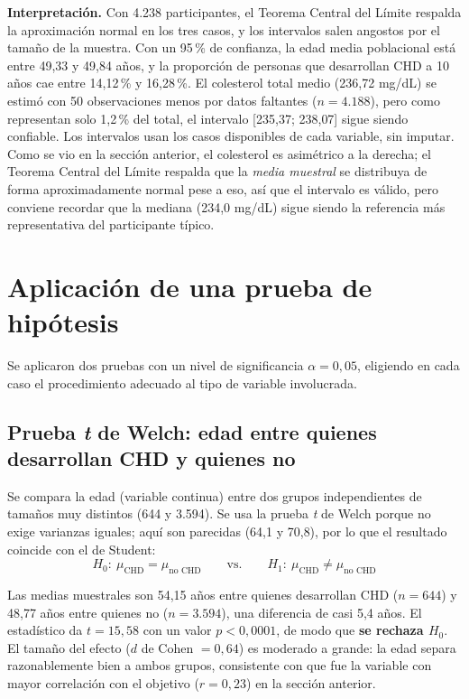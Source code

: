\documentclass[11pt,a4paper]{article}
\begin{document}
\textbf{Interpretación.} Con 4.238 participantes, el Teorema Central del Límite respalda la
aproximación normal en los tres casos, y los intervalos salen angostos por el tamaño de la
muestra. Con un 95\,\% de confianza, la edad media poblacional está entre 49{,}33 y 49{,}84 años, y la
proporción de personas que desarrollan CHD a 10 años cae entre 14{,}12\,\% y 16{,}28\,\%. El colesterol
total medio (236{,}72 mg/dL) se estimó con 50 observaciones menos por datos faltantes ($n=4.188$),
pero como representan solo 1{,}2\,\% del total, el intervalo [235{,}37; 238{,}07] sigue siendo confiable. Los intervalos usan los casos disponibles de cada variable, sin imputar. Como se vio en la sección anterior, el colesterol es asimétrico a la derecha; el Teorema Central
del Límite respalda que la \textit{media muestral} se distribuya de forma aproximadamente normal
pese a eso, así que el intervalo es válido, pero conviene recordar que la mediana (234{,}0 mg/dL)
sigue siendo la referencia más representativa del participante típico.

\section{Aplicación de una prueba de hipótesis}

Se aplicaron dos pruebas con un nivel de significancia $\alpha = 0{,}05$, eligiendo en cada caso el
procedimiento adecuado al tipo de variable involucrada.

\subsection{Prueba \textit{t} de Welch: edad entre quienes desarrollan CHD y quienes no}
Se compara la edad (variable continua) entre dos grupos independientes de tamaños muy distintos (644 y 3.594). Se usa la prueba \textit{t} de Welch porque no exige varianzas iguales; aquí son parecidas (64{,}1 y 70{,}8), por lo que el resultado coincide con el de Student:
$$H_0:\ \mu_{\text{CHD}} = \mu_{\text{no CHD}} \qquad \text{vs.} \qquad H_1:\ \mu_{\text{CHD}} \neq \mu_{\text{no CHD}}$$

Las medias muestrales son 54{,}15 años entre quienes desarrollan CHD ($n=644$) y 48{,}77 años entre
quienes no ($n=3.594$), una diferencia de casi 5{,}4 años. El estadístico da $t=15{,}58$ con un valor
$p<0{,}0001$, de modo que \textbf{se rechaza $H_0$}. El tamaño del efecto ($d$ de Cohen $=0{,}64$) es
moderado a grande: la edad separa razonablemente bien a ambos grupos, consistente con que fue la
variable con mayor correlación con el objetivo ($r=0{,}23$) en la sección anterior.
\end{document}
